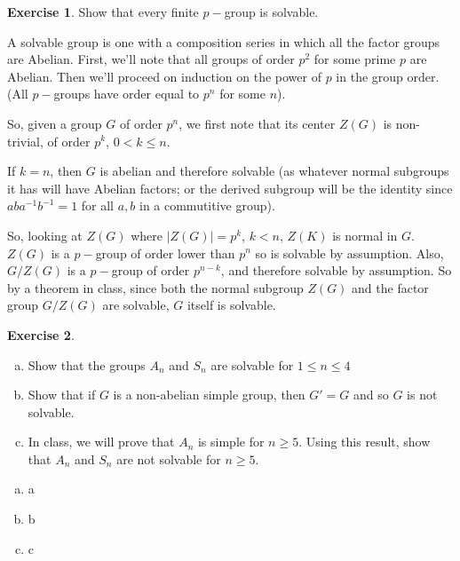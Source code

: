 \documentclass[11pt,oneside]{article}
\numberwithin{equation}{section}
\theoremstyle{definition}
\newtheorem{exercise}{Exercise}
\begin{document}
\begin{exercise}
  Show that every finite $p-$group is solvable.
\end{exercise}

\begin{solution}
  A solvable group is one with a composition series in which all the
  factor groups are Abelian.  First, we'll note that all groups of
  order $p^2$ for some prime $p$ are Abelian. Then we'll proceed on
  induction on the power of $p$ in the group order.  (All $p-$groups
  have order equal to $p^n$ for some $n$).
  
  So, given a group $G$ of order $p^n$, we first note that its
  center $Z(G)$ is non-trivial, of order $p^k$, $0 < k \leq n$.
  
  If $k = n$, then $G$ is abelian and therefore solvable (as
  whatever normal subgroups it has will have Abelian factors; or the
  derived subgroup will be the identity since
  $a b a^{-1} b^{-1} = 1$ for all $a, b$ in a commutitive group).
  
  So, looking at $Z(G)$ where $|Z(G)| = p^k$, $k < n$, $Z(K)$ is
  normal in $G$.  $Z(G)$ is a $p-$group of order lower than $p^n$ so
  is solvable by assumption.  Also, $G / Z(G)$ is a $p-$group of
  order $p ^ { n - k}$, and therefore solvable by assumption. So by
  a theorem in class, since both the normal subgroup $Z(G)$ and the
  factor group $G/Z(G)$ are solvable, $G$ itself is solvable.
  
\end{solution}

\begin{exercise}
  \begin{enumerate}[(a)]
  \item
    Show that the groups $A_n$ and $S_n$ are solvable for $1 \leq n \leq 4$
  \item
    Show that if $G$ is a non-abelian simple group, then $G' = G$ and so $G$
    is not solvable.  
  \item
    In class, we will prove that $A_n$ is simple for $n \geq 5$.  Using this result, show that
    $A_n$ and $S_n$ are not solvable for $n \geq 5$. 
  \end{enumerate}
\end{exercise}
\begin{solution}
  \begin{enumerate}[(a)]
  \item
    a
  \item
    b
  \item
    c
  \end{enumerate}
\end{solution}
\end{document}
